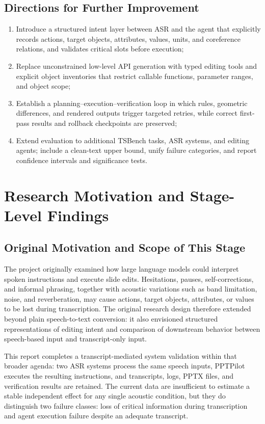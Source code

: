 \documentclass[11pt,a4paper,UTF8,fontset=fandol]{ctexart}
\begin{document}
\subsection{Directions for Further Improvement}

\begin{enumerate}
  \item Introduce a structured intent layer between ASR and the agent that explicitly records actions, target objects, attributes, values, units, and coreference relations, and validates critical slots before execution;
  \item Replace unconstrained low-level API generation with typed editing tools and explicit object inventories that restrict callable functions, parameter ranges, and object scope;
  \item Establish a planning--execution--verification loop in which rules, geometric differences, and rendered outputs trigger targeted retries, while correct first-pass results and rollback checkpoints are preserved;
  \item Extend evaluation to additional TSBench tasks, ASR systems, and editing agents; include a clean-text upper bound, unify failure categories, and report confidence intervals and significance tests.
\end{enumerate}

\section{Research Motivation and Stage-Level Findings}

\subsection{Original Motivation and Scope of This Stage}

The project originally examined how large language models could interpret spoken instructions and execute slide edits. Hesitations, pauses, self-corrections, and informal phrasing, together with acoustic variations such as band limitation, noise, and reverberation, may cause actions, target objects, attributes, or values to be lost during transcription. The original research design therefore extended beyond plain speech-to-text conversion: it also envisioned structured representations of editing intent and comparison of downstream behavior between speech-based input and transcript-only input.

This report completes a transcript-mediated system validation within that broader agenda: two ASR systems process the same speech inputs, PPTPilot executes the resulting instructions, and transcripts, logs, PPTX files, and verification results are retained. The current data are insufficient to estimate a stable independent effect for any single acoustic condition, but they do distinguish two failure classes: loss of critical information during transcription and agent execution failure despite an adequate transcript.
\end{document}
